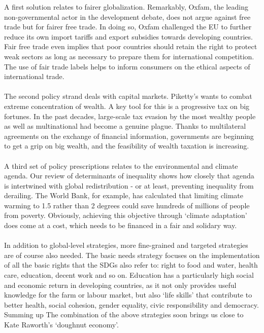 \documentclass[../summary.tex]{subfiles}
\begin{document}
	A first solution relates to fairer globalization. Remarkably, Oxfam, the leading non-governmental actor in the development debate, does not argue against free trade but for fairer free trade. In doing so, Oxfam challenged the EU to further reduce its own import tariffs and export subsidies towards developing countries. Fair free trade even implies that poor countries should retain the right to protect weak sectors as long as necessary to prepare them for international competition. The use of fair trade labels helps to inform consumers on the ethical aspects of international trade. 
	\\\\
	The second policy strand deals with capital markets. Piketty's wants to combat extreme concentration of wealth. A key tool for this is a progressive tax on big fortunes. In the past decades, large-scale tax evasion by the most wealthy people as well as multinational had become a genuine plague. Thanks to multilateral agreements on the exchange of financial information, governments are beginning to get a grip on big wealth, and the feasibility of wealth taxation is increasing.
	\\\\
	A third set of policy prescriptions relates to the environmental and climate agenda. Our review of determinants of inequality shows how closely that agenda is intertwined with global redistribution - or at least, preventing inequality from derailing. The World Bank, for example, has calculated that limiting climate warming to 1.5 rather than 2 degrees could save hundreds of millions of people from poverty. Obviously, achieving this objective through ‘climate adaptation’ does come at a cost, which needs to be financed in a fair and solidary way.
	\\\\
	In addition to global-level strategies, more fine-grained and targeted strategies are of course also needed. The basic needs strategy focuses on the implementation of all the basic rights that the SDGs also refer to: right to food and water, health care, education, decent work and so on. Education has a particularly high social and economic return in developing countries, as it not only provides useful knowledge for the farm or labour market, but also `life skills' that contribute to better health, social cohesion, gender equality, civic responsibility and democracy. Summing up The combination of the above strategies soon brings us close to Kate Raworth's `doughnut economy'.
	
\end{document}
